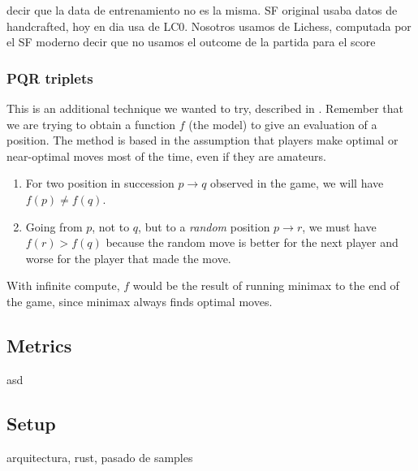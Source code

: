 decir que la data de entrenamiento no es la misma. SF original usaba datos de handcrafted, hoy en dia usa de LC0. Nosotros usamos de Lichess, computada por el SF moderno
decir que no usamos el outcome de la partida para el score


\subsubsection{PQR triplets}

This is an additional technique we wanted to try, described in \cite{dlchess:2014}. Remember that we are trying to obtain a function $f$ (the model) to give an evaluation of a position. The method is based in the assumption that players make optimal or near-optimal moves most of the time, even if they are amateurs.

\begin{enumerate}
\item For two position in succession $p \rightarrow q$  observed in the game, we will have $f(p) \neq f(q)$.
\item Going from $p$, not to $q$, but to a \textit{random} position $p \rightarrow r$, we must have $f(r) > f(q)$ because the random move is better for the next player and worse for the player that made the move.
\end{enumerate}

With infinite compute, $f$ would be the result of running minimax to the end of the game, since minimax always finds optimal moves.

\subsection{Metrics}

asd \cite{nnue:2018}

\subsection{Setup}

arquitectura, rust, pasado de samples
